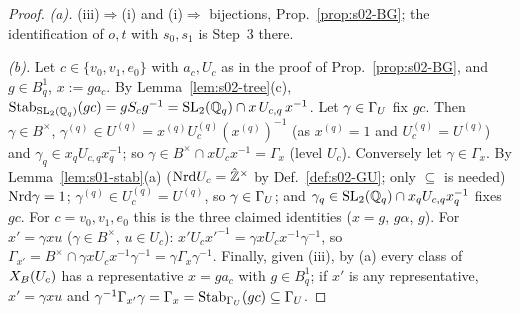 \begin{proof}
\emph{(a).} (iii)$\Rightarrow$(i) and (i)$\Rightarrow$ bijections, Prop.~\ref{prop:s02-BG}; the identification of $o,t$ with $s_0,s_1$ is
Step~3 there.

\emph{(b).} Let $c\in\{v_0,v_1,e_0\}$ with $a_c,U_c$ as in the proof of Prop.~\ref{prop:s02-BG}, and $g\in B^1_q$, $x:=ga_c$. By
Lemma~\ref{lem:s02-tree}(c), $\operatorname{Stab}_{\mathrm{SL}_2(\mathbb{Q}_q)}(gc)=gS_cg^{-1}=\mathrm{SL}_2(\mathbb{Q}_q)\cap x\,U_{c,q}\,x^{-1}$. Let $\gamma\in\Gamma_U$ fix $gc$. Then
$\gamma\in B^\times$, $\gamma^{(q)}\in U^{(q)}=x^{(q)}U_c^{(q)}(x^{(q)})^{-1}$ (as $x^{(q)}=1$ and $U_c^{(q)}=U^{(q)}$) and
$\gamma_q\in x_qU_{c,q}x_q^{-1}$; so $\gamma\in B^\times\cap xU_cx^{-1}=\Gamma_x$ (level $U_c$). Conversely let $\gamma\in\Gamma_x$. By
Lemma~\ref{lem:s01-stab}(a) ($\mathrm{Nrd} U_c=\hat{\mathbb{Z}}^\times$ by Def.~\ref{def:s02-GU}; only $\subseteq$ is needed) $\mathrm{Nrd}\gamma=1$; $\gamma^{(q)}\in U_c^{(q)}=U^{(q)}$, so $\gamma\in\Gamma_U$; and $\gamma_q\in\mathrm{SL}_2(\mathbb{Q}_q)\cap x_qU_{c,q}x_q^{-1}$ fixes $gc$. For $c=v_0,v_1,e_0$ this is the
three claimed identities ($x=g$, $g\alpha$, $g$).
For $x'=\gamma xu$ ($\gamma\in B^\times$, $u\in U_c$): $x'U_cx'^{-1}=\gamma xU_cx^{-1}\gamma^{-1}$, so
$\Gamma_{x'}=B^\times\cap\gamma xU_cx^{-1}\gamma^{-1}=\gamma\Gamma_x\gamma^{-1}$. Finally, given (iii), by (a) every class of $X_B(U_c)$ has a
representative $x=ga_c$ with $g\in B^1_q$; if $x'$ is any representative, $x'=\gamma xu$ and $\gamma^{-1}\Gamma_{x'}\gamma=\Gamma_x
=\operatorname{Stab}_{\Gamma_U}(gc)\subseteq\Gamma_U$.


\end{proof}
